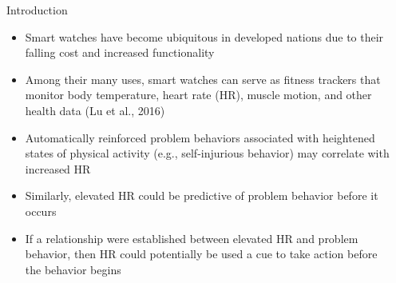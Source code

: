 \documentclass[final]{beamer}
\newlength{\sepwid}
\newlength{\onecolwid}
\begin{document}
\setlength{\belowcaptionskip}{2ex} %
\setlength\belowdisplayshortskip{2ex} %

\begin{frame}[t] %

\begin{columns}[t] %

\begin{column}{\sepwid}\end{column} %

\begin{column}{\onecolwid} %


\begin{alertblock}{Introduction}
	
	\begin{itemize}
		\item Smart watches have become ubiquitous in developed nations due to their falling cost and increased functionality
		\item Among their many uses, smart watches can serve as fitness trackers that monitor body temperature, heart rate (HR), muscle motion, and other health data (Lu et al., 2016)
		\item Automatically reinforced problem behaviors associated with heightened states of physical activity (e.g., self-injurious behavior) may correlate with increased HR
		\item Similarly, elevated HR could be predictive of problem behavior before it occurs
		\item If a relationship were established between elevated HR and problem behavior, then HR could potentially be used a cue to take action before the behavior begins
		
	\end{itemize}

\end{alertblock}



\end{column}
\end{columns}
\end{frame}
\end{document}
